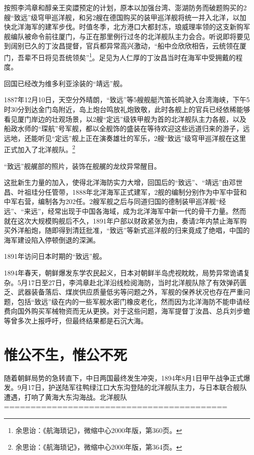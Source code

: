 \documentclass[12pt,UTF8]{ctexbook}
\begin{document}
按照李鸿章和醇亲王奕譞预定的计划，原本以加强台湾、澎湖防务而破题购买的2艘“致远”级穹甲巡洋舰，和另2艘在德国购买的装甲巡洋舰将统一并入北洋，以加快北洋海军的建军步伐。时值冬季，北方港口大都封冻，琅威理率领的这支新购军舰编队被命令前往厦门，与正在那里例行过冬的北洋舰队主力会合。听说即将要见到阔别已久的丁汝昌提督，官兵都异常高兴激动，“船中佥欣欣相告，云统领在厦门，吾辈不日将见吾统领矣”\footnote{余思诒：《航海琐记》，微缩中心2000年版，第360页。}。足见为人仁厚的丁汝昌当时在海军中受拥戴的程度。

回国已经改为维多利亚涂装的“靖远”舰。

1887年12月10日，天空分外晴朗，“致远”等5艘舰艇汽笛长鸣驶入台湾海峡，下午5时30分到达金门岛附近，岛上炮台鸣放礼炮致敬，此时各舰上的官兵已经依稀能够看见厦门岸边的壮观场景，以2艘“定远”级铁甲舰为首的北洋舰队主力各舰，以及船政水师的“琛航”号军舰，都以全舰饰的盛装在等待欢迎这些远道归来的游子，远远地，还能听见“定远”舰上正在演奏雄壮的军乐，2艘“致远”级穹甲巡洋舰在这里正式加入了北洋舰队。\footnote{余思诒：《航海琐记》，微缩中心2000年版，第364页。}

“致远”舰艉部的照片，装饰在舰艉的龙纹异常醒目。

这批新生力量的加入，使得北洋海防实力大增，回国后的“致远”、“靖远”由邓世昌、叶祖珪分任管带，1888年北洋海军正式建军，2舰的编制分别作为中军中营和中军右营，编制各为202任。2艘军舰之后与同道归国的德制装甲巡洋舰“经远”、“来远”，经常出现于中国各海域，成为北洋海军中新一代的骨干力量。然而就在这次大规模购舰后不久，1891年户部以财政紧张为由，奏请2年内禁止海军购买外洋船炮，随即得到清廷批准，“致远”等新式巡洋舰的归来竟成了绝唱，中国的海军建设陷入停顿倒退的深渊。

1891年访问日本时期的“致远”舰。

1894年春天，朝鲜爆发东学农民起义，日本对朝鲜半岛虎视眈眈，局势异常诡谲复杂。5月17日至27日，李鸿章赴北洋沿线检阅海防，当时北洋舰队除了有效弹药匮乏、武器装备落后、煤炭供应质量低劣等问题之外，军舰的保养状况也存在严重问题，包括“致远”级在内的一些军舰水密门橡皮老化，然而因为北洋海防不能申请经费向国外购买军械物资而无从更换。对于这些问题，海军提督丁汝昌、总兵刘步蟾等曾多次上报呼吁，但最终结果都是石沉大海。

\section{惟公不生，惟公不死}

随着朝鲜局势的急转直下，中日两国最终发生冲突，1894年8月1日甲午战争正式爆发。9月17日，护送陆军往鸭绿江口大东沟登陆的北洋舰队主力，与日本联合舰队遭遇，打响了黄海大东沟海战。北洋舰队
==========================================
\end{document}
